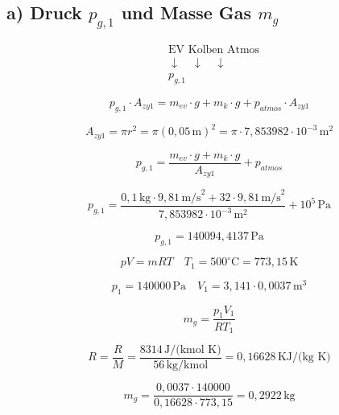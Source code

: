 \subsection*{a) Druck $p_{g,1}$ und Masse Gas $m_g$}

\begin{equation*}
\begin{aligned}
    &\text{EV Kolben Atmos} \\
    &\downarrow \quad \downarrow \quad \downarrow \\
    &p_{g,1}
\end{aligned}
\end{equation*}

\begin{equation*}
    p_{g,1} \cdot A_{zy1} = m_{ev} \cdot g + m_{k} \cdot g + p_{atmos} \cdot A_{zy1}
\end{equation*}

\begin{equation*}
    A_{zy1} = \pi r^2 = \pi (0,05 \, \text{m})^2 = \pi \cdot 7,853982 \cdot 10^{-3} \, \text{m}^2
\end{equation*}

\begin{equation*}
    p_{g,1} = \frac{m_{ev} \cdot g + m_k \cdot g}{A_{zy1}} + p_{atmos}
\end{equation*}

\begin{equation*}
    p_{g,1} = \frac{0,1 \, \text{kg} \cdot 9,81 \, \text{m/s}^2 + 32 \cdot 9,81 \, \text{m/s}^2}{7,853982 \cdot 10^{-3} \, \text{m}^2} + 10^5 \, \text{Pa}
\end{equation*}

\begin{equation*}
    p_{g,1} = 140094,4137 \, \text{Pa}
\end{equation*}

\begin{equation*}
    pV = mRT \quad T_1 = 500^\circ \text{C} = 773,15 \, \text{K}
\end{equation*}

\begin{equation*}
    p_1 = 140000 \, \text{Pa} \quad V_1 = 3,141 \cdot 0,0037 \, \text{m}^3
\end{equation*}

\begin{equation*}
    m_g = \frac{p_1 V_1}{RT_1}
\end{equation*}

\begin{equation*}
    R = \frac{R}{M} = \frac{8314 \, \text{J/(kmol K)}}{56 \, \text{kg/kmol}} = 0,16628 \, \text{KJ/(kg K)}
\end{equation*}

\begin{equation*}
    m_g = \frac{0,0037 \cdot 140000}{0,16628 \cdot 773,15} = 0,2922 \, \text{kg}
\end{equation*}